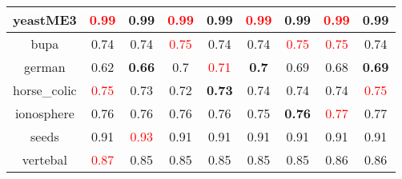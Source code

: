 \documentclass{article}%
\begin{document}
\begin{tabular}{c|cccccccc}
\hline%
yeastME3&\textcolor{red}{ 
0.99
}&0.99&\textcolor{red}{ 
0.99
}&0.99&\textcolor{red}{ 
0.99
}&0.99&\textcolor{red}{ 
0.99
}&0.99\\%
\hline%
bupa&0.74&0.74&\textcolor{red}{ 
0.75
}&0.74&0.74&\textcolor{red}{ 
0.75
}&\textcolor{red}{ 
0.75
}&0.74\\%
\hline%
german&0.62&\textbf{0.66}&0.7&\textcolor{red}{ 
0.71
}&\textbf{0.7}&0.69&0.68&\textbf{0.69}\\%
\hline%
horse\_colic&\textcolor{red}{ 
0.75
}&0.73&0.72&\textbf{0.73}&0.74&0.74&0.74&\textcolor{red}{ 
0.75
}\\%
\hline%
ionosphere&0.76&0.76&0.76&0.76&0.75&\textbf{0.76}&\textcolor{red}{ 
0.77
}&0.77\\%
\hline%
seeds&0.91&\textcolor{red}{ 
0.93
}&0.91&0.91&0.91&0.91&0.91&0.91\\%
\hline%
vertebal&\textcolor{red}{ 
0.87
}&0.85&0.85&0.85&0.85&0.85&0.86&0.86\\%
\hline%
\end{tabular}

%
\end{document}
